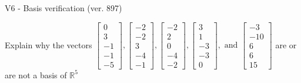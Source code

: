 \begin{exercise}
  \begin{exerciseTitle}V6 - Basis verification (ver. 897)\end{exerciseTitle}
  \begin{exerciseStatement}
    Explain why the vectors \(\left[\begin{array}{r}
0 \\
3 \\
-1 \\
-1 \\
-5
\end{array}\right] , \left[\begin{array}{r}
-2 \\
-2 \\
3 \\
-4 \\
-1
\end{array}\right] , \left[\begin{array}{r}
-2 \\
2 \\
0 \\
-4 \\
-2
\end{array}\right] , \left[\begin{array}{r}
3 \\
1 \\
-3 \\
-3 \\
0
\end{array}\right] , \text{ and } \left[\begin{array}{r}
-3 \\
-10 \\
6 \\
6 \\
15
\end{array}\right]\) are or are not a basis of \(\mathbb{R}^5\)	



\end{exerciseStatement}
\end{exercise}
